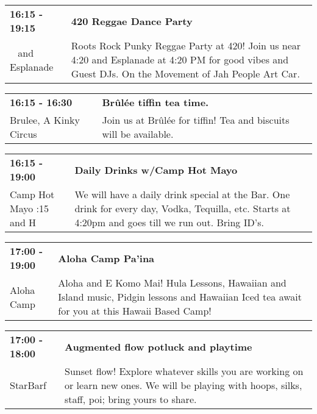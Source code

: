\begin{tabular}{ p{1in} p{2.2in} }
    \textbf{16:15 - 19:15} & \textbf{420 Reggae Dance Party} \\
    ~ \newline 420 and Esplanade  & Roots Rock Punky Reggae Party at 420! Join us near 4:20 and Esplanade at 4:20 PM for good vibes and Guest DJs. On the Movement of Jah People Art Car. \\
    \hline 
\end{tabular}
    
\begin{tabular}{ p{1in} p{2.2in} }
    \textbf{16:15 - 16:30} & \textbf{Br\^ul\'ee tiffin tea time.} \\
    Brulee, A Kinky Circus \newline  & Join us at Br\^ul\'ee for tiffin! Tea and biscuits will be available. \\
    \hline 
\end{tabular}
    
\begin{tabular}{ p{1in} p{2.2in} }
    \textbf{16:15 - 19:00} & \textbf{Daily Drinks w/Camp Hot Mayo} \\
    Camp Hot Mayo \newline 9:15 and H & We will have a daily drink special at the Bar.  One drink for every day, Vodka, Tequilla, etc.  Starts at 4:20pm and goes till we run out. Bring ID's. \\
    \hline 
\end{tabular}
    
\begin{tabular}{ p{1in} p{2.2in} }
    \textbf{17:00 - 19:00} & \textbf{Aloha Camp Pa'ina} \\
    Aloha Camp \newline  & Aloha and E Komo Mai!  Hula Lessons, Hawaiian and Island music, Pidgin lessons and Hawaiian Iced tea await for you at this Hawaii Based Camp! \\
    \hline 
\end{tabular}
    
\begin{tabular}{ p{1in} p{2.2in} }
    \textbf{17:00 - 18:00} & \textbf{Augmented flow potluck and playtime} \\
    StarBarf \newline  & Sunset flow! Explore whatever skills you are working on or learn new ones. We will be playing with hoops, silks, staff, poi; bring yours to share. \\
    \hline 
\end{tabular}
    
